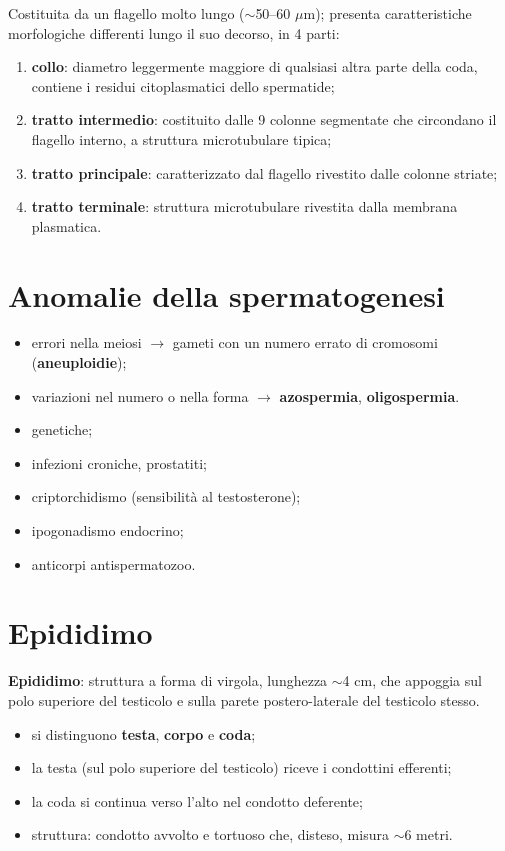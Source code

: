 Costituita da un flagello molto lungo ($\sim$50--60 $\mu$m); presenta caratteristiche
morfologiche differenti lungo il suo decorso, in 4 parti:
\begin{enumerate}
  \item \textbf{collo}: diametro leggermente maggiore di qualsiasi altra parte della coda,
    contiene i residui citoplasmatici dello spermatide;
  \item \textbf{tratto intermedio}: costituito dalle 9 colonne segmentate che circondano il
    flagello interno, a struttura microtubulare tipica;
  \item \textbf{tratto principale}: caratterizzato dal flagello rivestito dalle colonne striate;
  \item \textbf{tratto terminale}: struttura microtubulare rivestita dalla membrana plasmatica.
\end{enumerate}

\section{Anomalie della spermatogenesi}

\begin{itemize}
  \item errori nella meiosi $\rightarrow$ gameti con un numero errato di cromosomi
    (\textbf{aneuploidie});
  \item variazioni nel numero o nella forma $\rightarrow$ \textbf{azospermia}, \textbf{oligospermia}.
\end{itemize}

\begin{itemize}
  \item genetiche;
  \item infezioni croniche, prostatiti;
  \item criptorchidismo (sensibilità al testosterone);
  \item ipogonadismo endocrino;
  \item anticorpi antispermatozoo.
\end{itemize}

\section{Epididimo}

\textbf{Epididimo}: struttura a forma di virgola, lunghezza $\sim$4 cm, che appoggia sul polo
superiore del testicolo e sulla parete postero-laterale del testicolo stesso.
\begin{itemize}
  \item si distinguono \textbf{testa}, \textbf{corpo} e \textbf{coda};
  \item la testa (sul polo superiore del testicolo) riceve i condottini efferenti;
  \item la coda si continua verso l'alto nel condotto deferente;
  \item struttura: condotto avvolto e tortuoso che, disteso, misura $\sim$6 metri.
\end{itemize}

